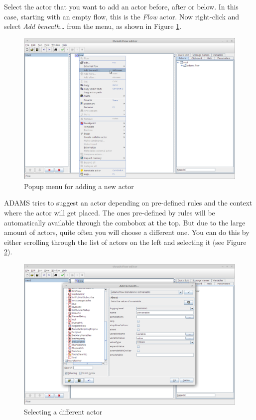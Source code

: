 Select the actor that you want to add an actor before, after or
below. In this case, starting with an empty flow, this is the
\textit{Flow} actor. Now right-click and select \textit{Add beneath\ldots} from
the menu, as shown in Figure \ref{floweditor-helloworld-addactor1}.

\begin{figure}[htb]
  \centering
  \includegraphics[width=12.0cm]{images/floweditor-helloworld-addactor1.png}
  \caption{Popup menu for adding a new actor}
  \label{floweditor-helloworld-addactor1}
\end{figure}

ADAMS tries to suggest an actor depending on pre-defined rules and the context 
where the actor will get placed. The ones pre-defined by rules will be 
automatically available through the combobox at the top. But due to the large 
amount of actors, quite often you will choose a different one. You can do this 
by either scrolling through the list of actors on the left and selecting it
(see Figure \ref{floweditor-helloworld-addactor2}).

\begin{figure}[htb]
  \centering
  \includegraphics[width=12.0cm]{images/floweditor-helloworld-addactor2.png}
  \caption{Selecting a different actor}
  \label{floweditor-helloworld-addactor2}
\end{figure}

